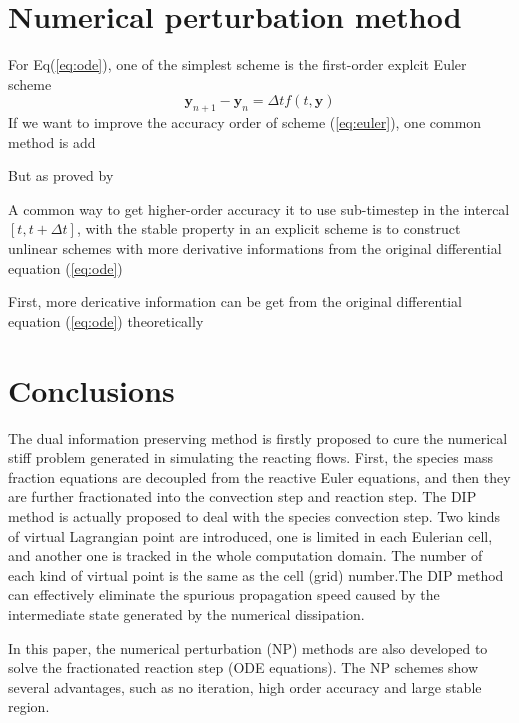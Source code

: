 \documentclass[review]{elsarticle}
\theoremstyle{plain}\newtheorem{definition}{\sc{Definition}}
\theoremstyle{defination}\newtheorem{example}{Example}[section]
\numberwithin{equation}{section}
\numberwithin{table}{section}
\begin{document}
{\section{Numerical perturbation method}

For Eq(\ref{eq:ode}), one of  the simplest scheme is the first-order explcit Euler scheme  
\begin{equation}\label{eq:euler}
  \bm{y}_{n+1}- \bm{y}_n = \Delta t f(t,\bm{y})
\end{equation}
If we want to improve the accuracy order of scheme (\ref{eq:euler}),  one common method is add 

But as proved by  

A common way to get higher-order accuracy it to use sub-timestep in the intercal $[t,t+\Delta t]$,    with the stable property in an explicit scheme  is to construct unlinear schemes with more derivative informations from the original differential equation (\ref{eq:ode}) 

First, more dericative information can be get from the original differential equation (\ref{eq:ode}) theoretically 








   



\section{Conclusions}

The dual information preserving method is firstly proposed to cure the numerical stiff problem generated in simulating the reacting flows. First, the species mass fraction equations are decoupled from the reactive Euler equations, and then they are further fractionated into the convection step and reaction step. The DIP method is actually proposed to deal with the species convection step. Two kinds of virtual Lagrangian point are introduced, one is limited in each Eulerian cell, and another one is tracked in the whole computation domain. The number of each kind of virtual point is the same as the cell (grid) number.The DIP method can effectively eliminate the spurious propagation speed caused by the intermediate state generated by the numerical dissipation.

In this paper, the numerical perturbation (NP) methods are also developed to solve the fractionated reaction step (ODE equations). The NP schemes show several advantages, such as no iteration, high order accuracy and large stable region.  

}
\end{document}
